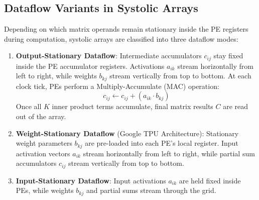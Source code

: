 \subsection{Dataflow Variants in Systolic Arrays}
Depending on which matrix operands remain stationary inside the PE registers during computation, systolic arrays are classified into three dataflow modes:

\begin{enumerate}[leftmargin=*]
    \item \textbf{Output-Stationary Dataflow}:
    Intermediate accumulators $c_{ij}$ stay fixed inside the PE accumulator registers. Activations $a_{ik}$ stream horizontally from left to right, while weights $b_{kj}$ stream vertically from top to bottom. At each clock tick, PEs perform a Multiply-Accumulate (MAC) operation:
    $$c_{ij} \leftarrow c_{ij} + (a_{ik} \cdot b_{kj})$$
    Once all $K$ inner product terms accumulate, final matrix results $C$ are read out of the array.
    
    \item \textbf{Weight-Stationary Dataflow} (Google TPU Architecture):
    Stationary weight parameters $b_{kj}$ are pre-loaded into each PE's local register. Input activation vectors $a_{ik}$ stream horizontally from left to right, while partial sum accumulators $c_{ij}$ stream vertically from top to bottom.
    
    \item \textbf{Input-Stationary Dataflow}:
    Input activations $a_{ik}$ are held fixed inside PEs, while weights $b_{kj}$ and partial sums stream through the grid.
\end{enumerate}

